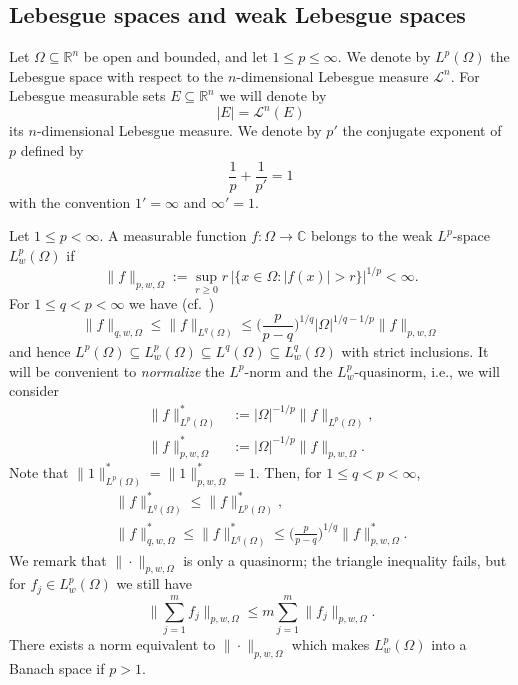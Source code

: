 \documentclass[12pt]{amsart}
\theoremstyle{plain}
\theoremstyle{definition}
\numberwithin{equation}{section}
\begin{document}
 
\subsection{Lebesgue spaces and weak Lebesgue spaces}  \label{Lebesgue}

Let ${\Omega} \subseteq {\mathbb{R}}^n$ be open and bounded, and let $1 \le p \le \infty$.
We denote by $L^p({\Omega})$ the Lebesgue space with respect to the $n$-dimensional Lebesgue measure ${\mathcal{L}}^n$. 
For Lebesgue measurable sets $E \subseteq {\mathbb{R}}^n$ we will denote by 
\[
  |E| = {\mathcal{L}}^n(E)
\]
its $n$-dimensional Lebesgue measure. We denote by $p'$ the conjugate exponent of $p$ defined by 
\[
  \frac 1p + \frac 1 {p'} =1
\]
with the convention $1' = \infty$ and $\infty' =1$.

Let $1 \le p < \infty$. 
A measurable function $f : {\Omega} \to {\mathbb{C}}$ belongs to the weak $L^p$-space $L_w^p({\Omega})$ if 
\[
\|f\|_{p,w,{\Omega}} := \sup_{r\ge 0}  r\, |\{x \in {\Omega} : |f(x)| > r\}|^{1/p} < \infty.
\]  
For $1 \le q < p < \infty$ we have (cf.\ \cite[Ex.\ 1.1.11]{Grafakos08})
\begin{equation} \label{eq:qp}
  \|f\|_{q,w,{\Omega}} \le \|f\|_{L^q({\Omega})} \le \Big(\frac{p}{p-q}\Big)^{1/q} 
  |{\Omega}|^{1/q-1/p} \|f\|_{p,w,{\Omega}}
\end{equation}
and hence
$L^p({\Omega}) \subseteq L_w^p({\Omega}) \subseteq L^q({\Omega}) \subseteq L_w^q({\Omega})$
with strict inclusions. 
It will be convenient to \emph{normalize} the $L^p$-norm and the $L^p_w$-quasinorm, i.e., we will consider 
\begin{align*}
  \|f\|^*_{L^p({\Omega})} &:= |{\Omega}|^{-1/p} \|f\|_{L^p({\Omega})},\\
  \|f\|^*_{p,w,{\Omega}} &:= |{\Omega}|^{-1/p} \|f\|_{p,w,{\Omega}}.
\end{align*}
Note that $\|1\|^*_{L^p({\Omega})} = \|1\|^*_{p,w,{\Omega}} =1$.
Then, for $1 \le q < p < \infty$,
\begin{gather}
  \|f\|^*_{L^q({\Omega})} \le \|f\|^*_{L^p({\Omega})}, \label{inclusions0}\\
  \|f\|^*_{q,w,{\Omega}} \le \|f\|^*_{L^q({\Omega})} \le \Big(\frac{p}{p-q}\Big)^{1/q} 
   \|f\|^*_{p,w,{\Omega}}. \label{inclusions}
\end{gather}
We remark that $\|\cdot\|_{p,w,{\Omega}}$ is only a quasinorm; the triangle inequality fails, but for  
$f_j \in L_w^p({\Omega})$ 
we still have
\[
\Big\|\sum_{j=1}^m f_j \Big\|_{p,w,{\Omega}} \le m \sum_{j=1}^m \|f_j\|_{p,w,{\Omega}}.
\]
There exists a norm equivalent to $\|\cdot\|_{p,w,{\Omega}}$ which makes $L_w^p({\Omega})$ into a Banach space if $p>1$. 
\end{document}
